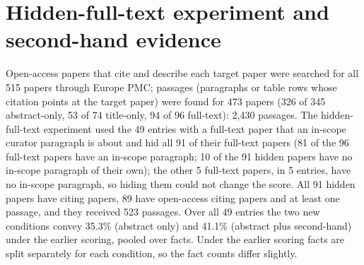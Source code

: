 \documentclass{article} %
\begin{document}
\FloatBarrier
\section{Hidden-full-text experiment and second-hand evidence}
\label{app:hidden}
Open-access papers that cite and describe each target paper were searched for all 515 papers through Europe PMC; passages (paragraphs or table rows whose citation points at the target paper) were found for 473 papers (326 of 345 abstract-only, 53 of 74 title-only, 94 of 96 full-text): 2,430 passages. The hidden-full-text experiment used the 49 entries with a full-text paper that an in-scope curator paragraph is about and hid all 91 of their full-text papers (81 of the 96 full-text papers have an in-scope paragraph; 10 of the 91 hidden papers have no in-scope paragraph of their own); the other 5 full-text papers, in 5 entries, have no in-scope paragraph, so hiding them could not change the score. All 91 hidden papers have citing papers, 89 have open-access citing papers and at least one passage, and they received 523 passages. Over all 49 entries the two new conditions convey 35.3\% (abstract only) and 41.1\% (abstract plus second-hand) under the earlier scoring, pooled over facts. Under the earlier scoring facts are split separately for each condition, so the fact counts differ slightly.
\end{document}
